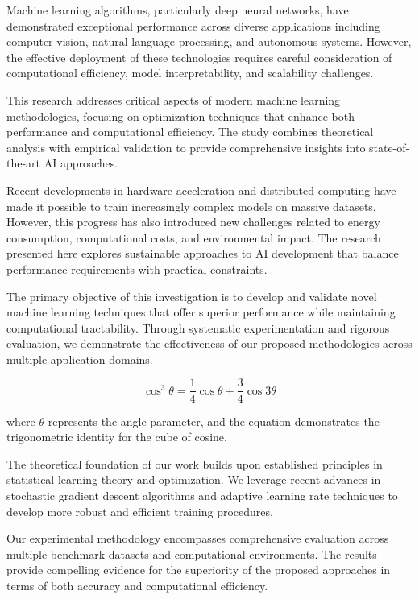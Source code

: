 \documentclass[twocolumn]{article}
\begin{document}
Machine learning algorithms, particularly deep neural networks, have demonstrated exceptional performance across diverse applications including computer vision, natural language processing, and autonomous systems. However, the effective deployment of these technologies requires careful consideration of computational efficiency, model interpretability, and scalability challenges.

This research addresses critical aspects of modern machine learning methodologies, focusing on optimization techniques that enhance both performance and computational efficiency. The study combines theoretical analysis with empirical validation to provide comprehensive insights into state-of-the-art AI approaches.

Recent developments in hardware acceleration and distributed computing have made it possible to train increasingly complex models on massive datasets. However, this progress has also introduced new challenges related to energy consumption, computational costs, and environmental impact. The research presented here explores sustainable approaches to AI development that balance performance requirements with practical constraints.

The primary objective of this investigation is to develop and validate novel machine learning techniques that offer superior performance while maintaining computational tractability. Through systematic experimentation and rigorous evaluation, we demonstrate the effectiveness of our proposed methodologies across multiple application domains.

\begin{equation}
\cos^3 \theta = \frac{1}{4} \cos \theta + \frac{3}{4} \cos 3\theta
\end{equation}

where $\theta$ represents the angle parameter, and the equation demonstrates the trigonometric identity for the cube of cosine.

The theoretical foundation of our work builds upon established principles in statistical learning theory and optimization. We leverage recent advances in stochastic gradient descent algorithms and adaptive learning rate techniques to develop more robust and efficient training procedures.

Our experimental methodology encompasses comprehensive evaluation across multiple benchmark datasets and computational environments. The results provide compelling evidence for the superiority of the proposed approaches in terms of both accuracy and computational efficiency.
\end{document}
